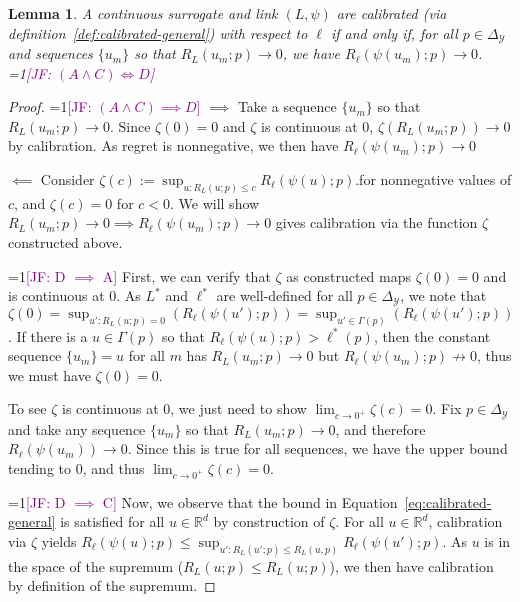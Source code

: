 \documentclass{article}
\newcommand{\Comments}{1}
\newcommand{\mynote}[2]{\ifnum\Comments=1\textcolor{#1}{#2}\fi}
\newcommand{\jessie}[1]{\mynote{purple}{[JF: #1]}}
\newcommand{\reals}{\mathbb{R}}
\newcommand{\simplex}{\Delta_\Y}
\newcommand{\Y}{\mathcal{Y}}
\newcommand{\risk}[1]{#1^*}
\newtheorem{lemma}{Lemma}
\begin{document}
\begin{lemma}\label{lem:calib-converging-regrets}
	A continuous surrogate and link $(L,\psi)$ are calibrated (via definition~\ref{def:calibrated-general}) with respect to $\ell$ if and only if, for all $p \in \simplex$ and sequences $\{u_m\}$ so that $R_L(u_m; p) \to 0$, we have $R_\ell(\psi(u_m); p) \to 0$.
	\jessie{$(A \wedge C) \iff D$}
\end{lemma}
\begin{proof}
\jessie{$(A \wedge C) \implies D$}
	$\implies$ Take a sequence $\{u_m\}$ so that $R_L(u_m;p) \to 0$.
	Since $\zeta(0) = 0$ and $\zeta$ is continuous at $0$, $\zeta(R_L(u_m;p)) \to 0$ by calibration.
	As regret is nonnegative, we then have $R_\ell(\psi(u_m); p) \to 0$
	
	$\impliedby$ Consider $\zeta(c) := \sup_{u: R_L(u;p) \leq c} R_\ell(\psi(u); p)$.for nonnegative values of $c$, and $\zeta(c) = 0$ for $c < 0$.
	We will show $R_L(u_m; p) \to 0 \implies R_\ell(\psi(u_m); p) \to 0$ gives calibration via the function $\zeta$ constructed above. 
	
\jessie{D $\implies$ A}
	First, we can verify that $\zeta$ as constructed maps $\zeta(0) = 0$ and is continuous at $0$.	
	As $\risk{L}$ and $\risk{\ell}$ are well-defined for all $p \in \simplex$, we note that $\zeta(0) = \sup_{u':R_L(u;p) = 0} (R_\ell(\psi(u'); p)) = \sup_{u' \in \Gamma(p)} (R_\ell(\psi(u'); p))$.
	If there is a $u \in \Gamma(p)$ so that $R_\ell(\psi(u); p) > \risk{\ell}(p)$, then the constant sequence $\{u_m\} = u$ for all $m$ has $R_L(u_m;p) \to 0$ but $R_\ell(\psi(u_m); p) \not \to 0$, thus we must have $\zeta(0) = 0$.
	
	To see $\zeta$ is continuous at $0$, we just need to show $\lim_{c \to 0^+} \zeta(c) = 0$. 
	Fix $p \in \simplex$ and take any sequence $\{u_m\}$ so that $R_L(u_m; p) \to 0$, and therefore $R_\ell(\psi(u_m)) \to 0$.
	Since this is true for all sequences, we have the upper bound tending to $0$, and thus $\lim_{c\to 0^+}\zeta(c) = 0$.
		
\jessie{D $\implies$ C}
	Now, we observe that the bound in Equation~\eqref{eq:calibrated-general} is satisfied for all $u \in \reals^d$ by construction of $\zeta$.	
	For all $u \in \reals^d$, calibration via $\zeta$ yields $R_\ell(\psi(u);p) \leq \sup_{u' : R_L(u';p) \leq R_L(u,p)} R_\ell(\psi(u') ; p)$.
	As $u$ is in the space of the supremum ($R_L(u;p) \leq R_L(u;p)$), we then have calibration by definition of the supremum.
\end{proof}
\end{document}
